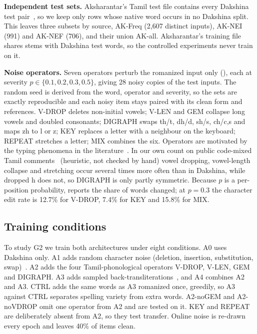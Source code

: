 \documentclass[conference]{IEEEtran}
\begin{document}
\textbf{Independent test sets.}
Aksharantar's Tamil test file contains every Dakshina test pair~\cite{madhani2023aksharantar}, so we keep only rows whose native word occurs in no Dakshina split.
This leaves three subsets by source, AK-Freq (2{,}607 distinct inputs), AK-NEI (991) and AK-NEF (706), and their union AK-all.
Aksharantar's training file shares stems with Dakshina test words, so the controlled experiments never train on it.

\textbf{Noise operators.}
Seven operators perturb the romanized input only (), each at severity $p\in\{0.1,0.2,0.3,0.5\}$, giving 28 noisy copies of the test inputs.
The random seed is derived from the word, operator and severity, so the sets are exactly reproducible and each noisy item stays paired with its clean form and references.
V-DROP deletes non-initial vowels; V-LEN and GEM collapse long vowels and doubled consonants; DIGRAPH swaps th/t, dh/d, sh/s, ch/c,s and maps zh to l or z; KEY replaces a letter with a neighbour on the keyboard; REPEAT stretches a letter; MIX combines the six.
Operators are motivated by the typing phenomena in the literature~\cite{wolfsonkin2019latin,herath2024tamzhi,belinkov2018synthetic}.
In our own count on public code-mixed Tamil comments~\cite{chakravarthi2020tamilmix} (heuristic, not checked by hand) vowel dropping, vowel-length collapse and stretching occur several times more often than in Dakshina, while dropped h does not, so DIGRAPH is only partly symmetric.
Because $p$ is a per-position probability,  reports the share of words changed; at $p{=}0.3$ the character edit rate is 12.7\% for V-DROP, 7.4\% for KEY and 15.8\% for MIX.

\begin{table}[t]
\caption{Noise operators and the share of test words they change (\%) at three severities.}
\label{tab:ops}
\centering\footnotesize
\resizebox{\columnwidth}{!}{}
\end{table}

\subsection{Training conditions}
To study G2 we train both architectures under eight conditions.
A0 uses Dakshina only.
A1 adds random character noise (deletion, insertion, substitution, swap)~\cite{karpukhin2019training}.
A2 adds the four Tamil-phonological operators V-DROP, V-LEN, GEM and DIGRAPH.
A3 adds sampled back-transliterations~\cite{sennrich2016backtranslation}, and A4 combines A2 and A3.
CTRL adds the same words as A3 romanized once, greedily, so A3 against CTRL separates spelling variety from extra words.
A2-noGEM and A2-noVDROP omit one operator from A2 and are tested on it.
KEY and REPEAT are deliberately absent from A2, so they test transfer.
Online noise is re-drawn every epoch and leaves 40\% of items clean.
\end{document}
